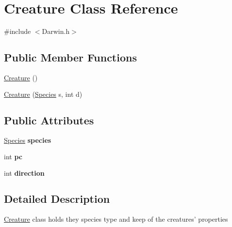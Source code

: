 \hypertarget{classCreature}{\section{\-Creature \-Class \-Reference}
\label{classCreature}
}


{\ttfamily \#include $<$\-Darwin.\-h$>$}

\subsection*{\-Public \-Member \-Functions}
\begin{DoxyCompactItemize}
\item 
\hyperlink{classCreature_a597cc3b08ee17de46c3e7ec3cf0d9b58}{\-Creature} ()
\item 
\hyperlink{classCreature_a4f3236ca916953f3dedda46875a1386e}{\-Creature} (\hyperlink{classSpecies}{\-Species} s, int d)
\end{DoxyCompactItemize}
\subsection*{\-Public \-Attributes}
\begin{DoxyCompactItemize}
\item 
\hypertarget{classCreature_ab0b67d0fe5520b895a7b3a4af4e80506}{\hyperlink{classSpecies}{\-Species} {\bfseries species}}\label{classCreature_ab0b67d0fe5520b895a7b3a4af4e80506}

\item 
\hypertarget{classCreature_a81b808ceee6ddc5c0a97e0b97b19a707}{int {\bfseries pc}}\label{classCreature_a81b808ceee6ddc5c0a97e0b97b19a707}

\item 
\hypertarget{classCreature_a6b3f59d2ca15b6781d81c3c141509976}{int {\bfseries direction}}\label{classCreature_a6b3f59d2ca15b6781d81c3c141509976}

\end{DoxyCompactItemize}


\subsection{\-Detailed \-Description}
\hyperlink{classCreature}{\-Creature} class holds they species type and keep of the creatures' properties 

